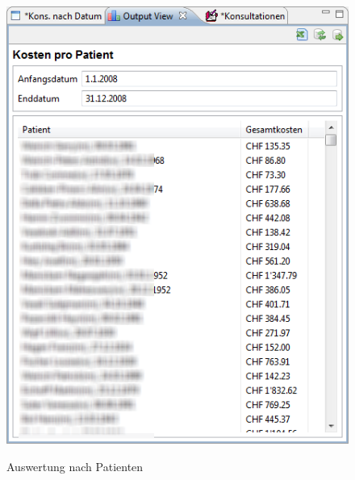 \documentclass[smallheadings,headsepline,12pt,a4paper,pagenumber=false]{scrartcl}
\begin{document}
\begin{figure}
  \includegraphics{patient}\\
  \caption{Auswertung nach Patienten}\label{Abb2}
\end{figure}
\end{document}
